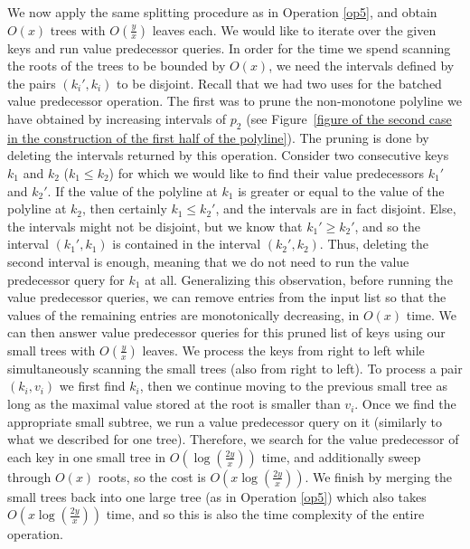 \documentclass[11pt,a4paper]{article}
\theoremstyle{definition}
\theoremstyle{remark}
\begin{document}
We now apply the same splitting procedure as in Operation \ref{op5}, and obtain $O(x)$ trees with $O(\frac{y}{x})$ leaves each. We would like to iterate over the given keys and run value predecessor queries. 
In order for the time we spend scanning the roots of the trees to be bounded by $O(x)$, we need the intervals defined by the pairs $(k_i',k_i)$ to be disjoint. Recall that we had two uses for the batched value predecessor operation. The first was to prune the non-monotone polyline we have obtained by increasing intervals of $p_2$ (see Figure~\ref{figure of the second case in the construction of the first half of the polyline}). The pruning is done by deleting the intervals returned by this operation.
%
Consider two consecutive keys $k_1$ and $k_2$ ($k_1 \leq k_2$) for which we would like to find their value predecessors $k_1'$ and $k_2'$. If the value of the polyline at $k_1$  is greater or equal to the value  of the polyline at $k_2$, then certainly $k_1 \leq k_2'$, and the intervals are in fact disjoint. Else, the intervals might not be disjoint, but we know that $k_1' \geq k_2'$, and so the interval $(k_1',k_1)$ is contained in the interval $(k_2',k_2)$. Thus, deleting the second interval is enough, meaning that we do not need to run the value predecessor query for $k_1$ at all. Generalizing this observation, before running the value predecessor queries, we can remove entries from the input list
so that the values of the remaining entries are  monotonically decreasing, in $O(x)$ time. 
We can then answer value predecessor queries for this pruned list of keys using our small trees with $O(\frac{y}{x})$ leaves. We process the keys from right to left while simultaneously scanning the small trees (also from right to left). To process a pair $(k_{i},v_{i})$ we first find $k_{i}$, then we continue moving to the previous small tree as long as the maximal value stored at the root is smaller than $v_{i}$. Once we find the appropriate small subtree, we run a value predecessor query on it (similarly to what we described for one tree). 
%
Therefore, we search for the value predecessor of each key in one small tree in $O(\log(\frac{2y}{x}))$ time,
and additionally sweep through $O(x)$ roots, so the cost is $O(x \log (\frac{2y}{x}))$. We finish by merging the small trees back into one large tree (as in Operation \ref{op5}) which also takes $O(x \log (\frac{2y}{x}))$ time, and so this is also the time complexity of the entire operation.
\end{document}
